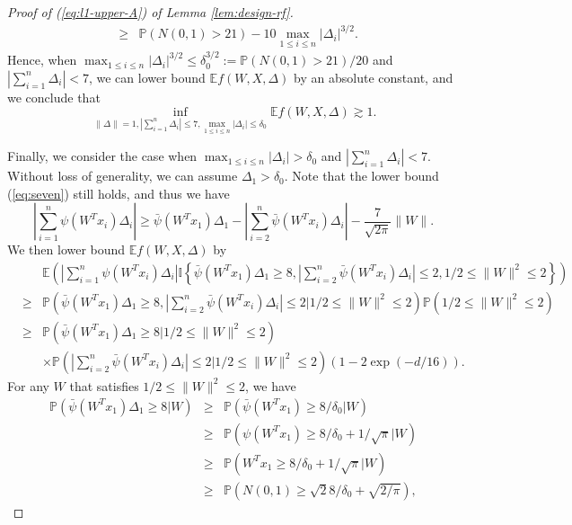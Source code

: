 \begin{proof}[Proof of (\ref{eq:l1-upper-A}) of Lemma \ref{lem:design-rf}]
\begin{eqnarray}
\nonumber &\geq& \mathbb{P}\left(N(0,1)>21\right) - 10\max_{1\leq i\leq n}|\Delta_i|^{3/2}.
\end{eqnarray}
Hence, when $\max_{1\leq i\leq n}|\Delta_i|^{3/2}\leq \delta_0^{3/2}:=\mathbb{P}\left(N(0,1)>21\right)/20$ and $\left|\sum_{i=1}^n\Delta_i\right|< 7$, we can lower bound $\mathbb{E}f(W,X,\Delta)$ by an absolute constant, and we conclude that
\begin{equation}
\inf_{\|\Delta\|=1,|\sum_{i=1}^n\Delta_i|\leq 7, \max_{1\leq i\leq n}|\Delta_i|\leq\delta_0}\mathbb{E}f(W,X,\Delta) \gtrsim 1.\label{eq:l1-1-2-relu}
\end{equation}

Finally, we consider the case when $\max_{1\leq i\leq n}|\Delta_i|> \delta_0$ and $\left|\sum_{i=1}^n\Delta_i\right|< 7$. Without loss of generality, we can assume $\Delta_1>\delta_0$. Note that the lower bound (\ref{eq:seven}) still holds, and thus we have
$$\left|\sum_{i=1}^n\psi(W^Tx_i)\Delta_i\right|\geq  \bar{\psi}(W^Tx_1)\Delta_1 - \left|\sum_{i=2}^n\bar{\psi}(W^Tx_i)\Delta_i\right| - \frac{7}{\sqrt{2\pi}}\|W\|.$$
We then lower bound $\mathbb{E}f(W,X,\Delta)$ by
\begin{eqnarray*}
&& \mathbb{E}\left(\left|\sum_{i=1}^n\psi(W^Tx_i)\Delta_i\right|\mathbb{I}\left\{ \bar{\psi}(W^Tx_1)\Delta_1 \geq 8, \left|\sum_{i=2}^n\bar{\psi}(W^Tx_i)\Delta_i\right|\leq 2, 1/2\leq \|W\|^2\leq 2\right\}\right) \\
&\geq& \mathbb{P}\left(\bar{\psi}(W^Tx_1)\Delta_1 \geq 8, \left|\sum_{i=2}^n\bar{\psi}(W^Tx_i)\Delta_i\right|\leq 2\Big|1/2\leq \|W\|^2\leq 2\right)\mathbb{P}\left(1/2\leq \|W\|^2\leq 2\right) \\
&\geq& \mathbb{P}\left(\bar{\psi}(W^Tx_1)\Delta_1 \geq 8\Big|1/2\leq \|W\|^2\leq 2\right) \\
&& \times \mathbb{P}\left(\left|\sum_{i=2}^n\bar{\psi}(W^Tx_i)\Delta_i\right|\leq 2\Big|1/2\leq \|W\|^2\leq 2\right)\left(1-2\exp(-d/16)\right).
\end{eqnarray*}
For any $W$ that satisfies $1/2\leq \|W\|^2\leq 2$, we have
\begin{eqnarray*}
\mathbb{P}\left(\bar{\psi}(W^Tx_1)\Delta_1 \geq 8\Big|W\right) &\geq& \mathbb{P}\left(\bar{\psi}(W^Tx_1)\geq 8/\delta_0\Big|W\right) \\
&\geq&  \mathbb{P}\left(\psi(W^Tx_1)\geq 8/\delta_0+1/\sqrt{\pi}\Big|W\right) \\
&\geq& \mathbb{P}\left(W^Tx_1\geq 8/\delta_0+1/\sqrt{\pi}\Big|W\right) \\
&\geq& \mathbb{P}\left(N(0,1)\geq \sqrt{2}8/\delta_0 + \sqrt{2/\pi}\right),

\end{eqnarray*}
\end{proof}
